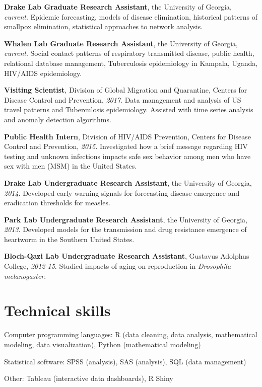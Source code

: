 \documentclass[letterpaper]{article}
\renewenvironment{itemize}{
  \begin{list}{}{
    \setlength{\leftmargin}{1.5em}
  }
}{
  \end{list}
}
\begin{document}
\begin{itemize}
\item \textbf{Drake Lab Graduate Research Assistant}, the University of Georgia, \textit{current}. Epidemic forecasting, models of disease elimination, historical patterns of smallpox elimination, statistical approaches to network analysis. 
\item \textbf{Whalen Lab Graduate Research Assistant}, the University of Georgia, \textit{current}. Social contact patterns of respiratory transmitted disease, public health, relational database management, Tuberculosis epidemiology in Kampala, Uganda, HIV/AIDS epidemiology. 
\item \textbf{Visiting Scientist}, Division of Global Migration and Quarantine, Centers for Disease Control and Prevention, \textit{2017}. Data management and analysis of US travel patterns and Tuberculosis epidemiology. Assisted with time series analysis and anomaly detection algorithms. 
\item \textbf{Public Health Intern}, Division of HIV/AIDS Prevention, Centers for Disease Control and Prevention, \textit{2015}. Investigated how a brief message regarding HIV testing and unknown infections impacts safe sex behavior among men who have sex with men (MSM) in the United States.
\item \textbf{Drake Lab Undergraduate Research Assistant}, the University of Georgia, \textit{2014}. Developed early warning signals for forecasting disease emergence and eradication thresholds  for measles.
\item \textbf{Park Lab Undergraduate Research Assistant}, the University of Georgia, \textit{2013}. Developed models for the transmission and drug resistance emergence of heartworm in the Southern United States. 
\item \textbf{Bloch-Qazi Lab Undergraduate Research Assistant}, Gustavus Adolphus College, \textit{2012-15}. Studied impacts of aging on reproduction in \textit{Drosophila melanogaster}. 

\end{itemize}

\section*{Technical skills}

\begin{itemize}
\item Computer programming languages: R (data cleaning, data analysis, mathematical modeling, data visualization), Python (mathematical modeling)
\item Statistical software: SPSS (analysis), SAS (analysis), SQL (data management)
\item Other: Tableau (interactive data dashboards), R Shiny  
\end{itemize}
\end{document}
